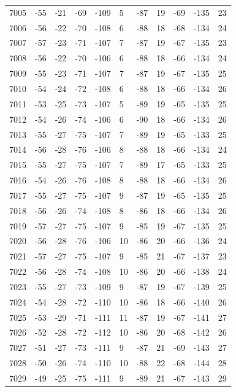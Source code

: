 \begin{table}[H]
\begin{tabular}{lllllllllll}
7005 & -55 & -21 & -69 & -109 & 5 & -87 & 19 & -69 & -135 & 23 \\
7006 & -56 & -22 & -70 & -108 & 6 & -88 & 18 & -68 & -134 & 24 \\
7007 & -57 & -23 & -71 & -107 & 7 & -87 & 19 & -67 & -135 & 23 \\
7008 & -56 & -22 & -70 & -106 & 6 & -88 & 18 & -66 & -134 & 24 \\
7009 & -55 & -23 & -71 & -107 & 7 & -87 & 19 & -67 & -135 & 25 \\
7010 & -54 & -24 & -72 & -108 & 6 & -88 & 18 & -66 & -134 & 26 \\
7011 & -53 & -25 & -73 & -107 & 5 & -89 & 19 & -65 & -135 & 25 \\
7012 & -54 & -26 & -74 & -106 & 6 & -90 & 18 & -66 & -134 & 26 \\
7013 & -55 & -27 & -75 & -107 & 7 & -89 & 19 & -65 & -133 & 25 \\
7014 & -56 & -28 & -76 & -106 & 8 & -88 & 18 & -66 & -134 & 24 \\
7015 & -55 & -27 & -75 & -107 & 7 & -89 & 17 & -65 & -133 & 25 \\
7016 & -54 & -26 & -76 & -108 & 8 & -88 & 18 & -66 & -134 & 26 \\
7017 & -55 & -27 & -75 & -107 & 9 & -87 & 19 & -65 & -135 & 25 \\
7018 & -56 & -26 & -74 & -108 & 8 & -86 & 18 & -66 & -134 & 26 \\
7019 & -57 & -27 & -75 & -107 & 9 & -85 & 19 & -67 & -135 & 25 \\
7020 & -56 & -28 & -76 & -106 & 10 & -86 & 20 & -66 & -136 & 24 \\
7021 & -57 & -27 & -75 & -107 & 9 & -85 & 21 & -67 & -137 & 23 \\
7022 & -56 & -28 & -74 & -108 & 10 & -86 & 20 & -66 & -138 & 24 \\
7023 & -55 & -27 & -73 & -109 & 9 & -87 & 19 & -67 & -139 & 25 \\
7024 & -54 & -28 & -72 & -110 & 10 & -86 & 18 & -66 & -140 & 26 \\
7025 & -53 & -29 & -71 & -111 & 11 & -87 & 19 & -67 & -141 & 27 \\
7026 & -52 & -28 & -72 & -112 & 10 & -86 & 20 & -68 & -142 & 26 \\
7027 & -51 & -27 & -73 & -111 & 9 & -87 & 21 & -69 & -143 & 27 \\
7028 & -50 & -26 & -74 & -110 & 10 & -88 & 22 & -68 & -144 & 28 \\
7029 & -49 & -25 & -75 & -111 & 9 & -89 & 21 & -67 & -143 & 29 \\

\end{tabular}
\end{table}
